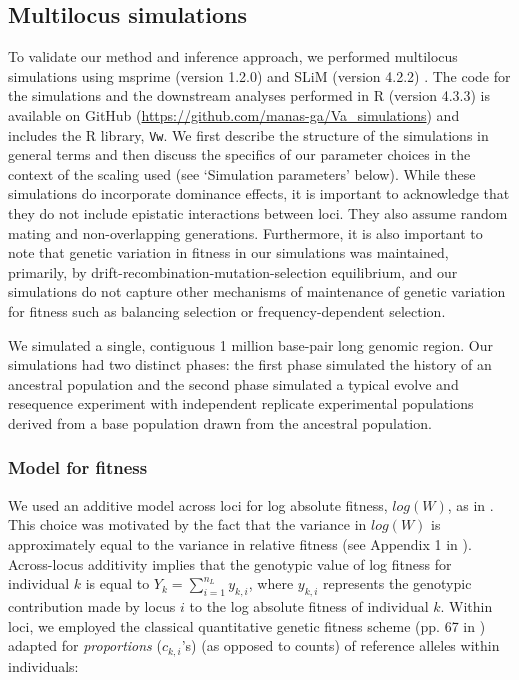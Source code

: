 \documentclass[12pt]{article}
\begin{document}
\begin{bibunit}
\subsection*{Multilocus simulations}
To validate our method and inference approach, we performed multilocus simulations using msprime (version 1.2.0) \citep{kelleher2016efficient} and SLiM (version 4.2.2) \citep{haller2023slim}. The code for the simulations and the downstream analyses performed in R (version 4.3.3) is available on GitHub (\url{https://github.com/manas-ga/Va_simulations}) and includes the R library, \texttt{Vw}. We first describe the structure of the simulations in general terms and then discuss the specifics of our parameter choices in the context of the scaling used (see `Simulation parameters' below). While these simulations do incorporate dominance effects, it is important to acknowledge that they do not include epistatic interactions between loci. They also assume random mating and non-overlapping generations. Furthermore, it is also important to note that genetic variation in fitness in our simulations was maintained, primarily, by drift-recombination-mutation-selection equilibrium, and our simulations do not capture other mechanisms of maintenance of genetic variation for fitness such as balancing selection or frequency-dependent selection.

We simulated a single, contiguous 1 million base-pair long genomic region. Our simulations had two distinct phases: the first phase simulated the history of an ancestral population and the second phase simulated a typical evolve and resequence experiment with independent replicate experimental populations derived from a base population drawn from the ancestral population.  

\subsubsection*{Model for fitness}

We used an additive model across loci for log absolute fitness, $log(W)$, as in \citet{buffalo2019linked}. This choice was motivated by the fact that the variance in $log(W)$ is approximately equal to the variance in relative fitness (see Appendix 1 in \citet{lynch1998}). Across-locus additivity implies that the genotypic value of log fitness for individual $k$ is equal to $Y_k = \sum_{i=1}^{n_L}{y_{k,i}}$, where  ${y_{k,i}}$ represents the genotypic contribution made by locus $i$ to the log absolute fitness of individual $k$. Within loci, we employed the classical quantitative genetic fitness scheme (pp. 67 in \citet{lynch1998}) adapted for \emph{proportions} ($c_{k,i}$'s) (as opposed to counts) of reference alleles within individuals: 


\end{bibunit}
\end{document}
